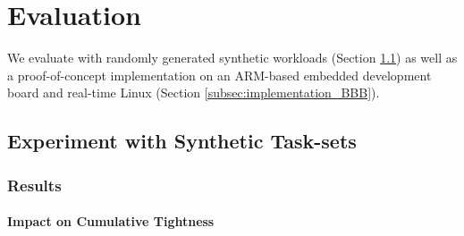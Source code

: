 \documentclass[../rt_server_main.tex]{subfiles}
\begin{document}
\section{Evaluation} \label{sec:evaluation}

We evaluate \coolname with randomly generated synthetic workloads %
 (Section \ref{subsec:results}) as well as a proof-of-concept implementation on an ARM-based  embedded development board and real-time Linux (Section \ref{subsec:implementation_BBB}). 


\subsection{Experiment with Synthetic Task-sets}
\label{subsec:results}




\subsubsection{Results}

\paragraph{Impact on Cumulative Tightness}





\end{document}

